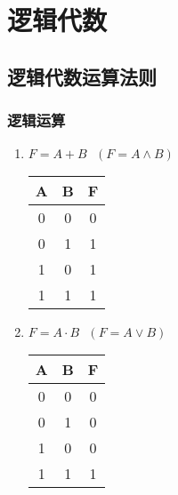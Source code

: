 \chapter{逻辑代数}
\newpage

\section{逻辑代数运算法则}

\subsection{逻辑运算}

\begin{enumerate}

    \item $F=A+B~~~(F=A\wedge B)$

          \begin{table}[!htbp]
              \centering
              \begin{tabular}{|c|c|c|}
                  \hline
                  A & B & F \\
                  \hline
                  0 & 0 & 0 \\
                  \hline
                  0 & 1 & 1 \\
                  \hline
                  1 & 0 & 1 \\
                  \hline
                  1 & 1 & 1 \\
                  \hline
              \end{tabular}
          \end{table}

    \item $F=A\cdot B~~~(F=A\vee B)$

          \begin{table}[!htbp]
              \centering
              \begin{tabular}{|c|c|c|}
                  \hline
                  A & B & F \\
                  \hline
                  0 & 0 & 0 \\
                  \hline
                  0 & 1 & 0 \\
                  \hline
                  1 & 0 & 0 \\
                  \hline
                  1 & 1 & 1 \\
                  \hline
              \end{tabular}
          \end{table}


\end{enumerate}
